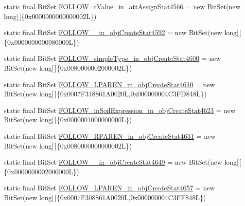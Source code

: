 \begin{DoxyCompactItemize}
\item 
static final Bit\-Set \hyperlink{classorg_1_1tzi_1_1use_1_1parser_1_1shell_1_1_shell_command_parser_aae1c887acc6086d094336987a4ade507}{F\-O\-L\-L\-O\-W\-\_\-r\-Value\-\_\-in\-\_\-att\-Assign\-Stat4566} = new Bit\-Set(new long\mbox{[}$\,$\mbox{]}\{0x0000000000000002\-L\})
\item 
static final Bit\-Set \hyperlink{classorg_1_1tzi_1_1use_1_1parser_1_1shell_1_1_shell_command_parser_a37d600c64af9a0386bef9be18e742893}{F\-O\-L\-L\-O\-W\-\_\-\_\-in\-\_\-obj\-Create\-Stat4592} = new Bit\-Set(new long\mbox{[}$\,$\mbox{]}\{0x0000000000080000\-L\})
\item 
static final Bit\-Set \hyperlink{classorg_1_1tzi_1_1use_1_1parser_1_1shell_1_1_shell_command_parser_a506092105ef921cb25e035a466631f45}{F\-O\-L\-L\-O\-W\-\_\-simple\-Type\-\_\-in\-\_\-obj\-Create\-Stat4600} = new Bit\-Set(new long\mbox{[}$\,$\mbox{]}\{0x0080000002000002\-L\})
\item 
static final Bit\-Set \hyperlink{classorg_1_1tzi_1_1use_1_1parser_1_1shell_1_1_shell_command_parser_a13541f3ca2d8c48ebc7b7f845fec2a11}{F\-O\-L\-L\-O\-W\-\_\-\-L\-P\-A\-R\-E\-N\-\_\-in\-\_\-obj\-Create\-Stat4610} = new Bit\-Set(new long\mbox{[}$\,$\mbox{]}\{0x0007\-F318861\-A0020\-L,0x000000004\-C3\-F\-D848\-L\})
\item 
static final Bit\-Set \hyperlink{classorg_1_1tzi_1_1use_1_1parser_1_1shell_1_1_shell_command_parser_a7dc804f34b0b57816dc0a6cedac85f43}{F\-O\-L\-L\-O\-W\-\_\-in\-Soil\-Expression\-\_\-in\-\_\-obj\-Create\-Stat4623} = new Bit\-Set(new long\mbox{[}$\,$\mbox{]}\{0x0000001000000000\-L\})
\item 
static final Bit\-Set \hyperlink{classorg_1_1tzi_1_1use_1_1parser_1_1shell_1_1_shell_command_parser_a6a9caafa51b0908a1eb9604ca1f28fc6}{F\-O\-L\-L\-O\-W\-\_\-\-R\-P\-A\-R\-E\-N\-\_\-in\-\_\-obj\-Create\-Stat4631} = new Bit\-Set(new long\mbox{[}$\,$\mbox{]}\{0x0080000000000002\-L\})
\item 
static final Bit\-Set \hyperlink{classorg_1_1tzi_1_1use_1_1parser_1_1shell_1_1_shell_command_parser_ab31fbd1abccd6c47832d2568b57a07b5}{F\-O\-L\-L\-O\-W\-\_\-\_\-in\-\_\-obj\-Create\-Stat4649} = new Bit\-Set(new long\mbox{[}$\,$\mbox{]}\{0x0000000002000000\-L\})
\item 
static final Bit\-Set \hyperlink{classorg_1_1tzi_1_1use_1_1parser_1_1shell_1_1_shell_command_parser_ae181e58b3fd8dafcd5e3fcc71fec1340}{F\-O\-L\-L\-O\-W\-\_\-\-L\-P\-A\-R\-E\-N\-\_\-in\-\_\-obj\-Create\-Stat4657} = new Bit\-Set(new long\mbox{[}$\,$\mbox{]}\{0x0007\-F308861\-A0020\-L,0x000000004\-C3\-F\-F848\-L\})

\end{DoxyCompactItemize}
